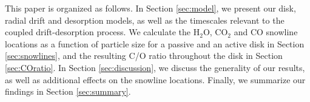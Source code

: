 \documentclass[apj]{emulateapj}
\newcommand{\emgr}[1]{\emph{ \color{gray} #1}}
\begin{document}





This paper is organized as follows. In Section \ref{sec:model}, we present our disk, radial drift and desorption models, as well as the timescales relevant to the coupled drift-desorption process. We calculate the H$_2$O, CO$_2$ and CO snowline locations as a function of particle size for a passive and an active disk in Section \ref{sec:snowlines}, and the resulting C/O ratio throughout the disk in Section \ref{sec:COratio}. In Section \ref{sec:discussion}, we discuss the generality of our results, as well as additional effects on the snowline locations. Finally, we summarize our findings in Section \ref{sec:summary}.
\end{document}
